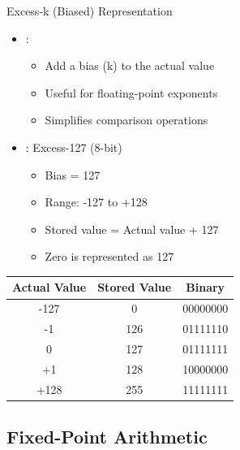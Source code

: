 \begin{frame}{Excess-k (Biased) Representation}
\begin{itemize}
\item {}:
\begin{itemize}
\item Add a bias (k) to the actual value
\item Useful for floating-point exponents
\item Simplifies comparison operations
\end{itemize}
\vspace{0.5cm}
\item {}: Excess-127 (8-bit)
\begin{itemize}
\item Bias = 127
\item Range: -127 to +128
\item Stored value = Actual value + 127
\item Zero is represented as 127
\end{itemize}
\end{itemize}

\vspace{0.3cm}
\begin{center}
\begin{tabular}{|c|c|c|}
\hline
\textbf{Actual Value} & \textbf{Stored Value} & \textbf{Binary} \\
\hline
-127 & 0 & 00000000 \\
-1 & 126 & 01111110 \\
0 & 127 & 01111111 \\
+1 & 128 & 10000000 \\
+128 & 255 & 11111111 \\
\hline
\end{tabular}
\end{center}
\end{frame}

\subsection{Fixed-Point Arithmetic}

